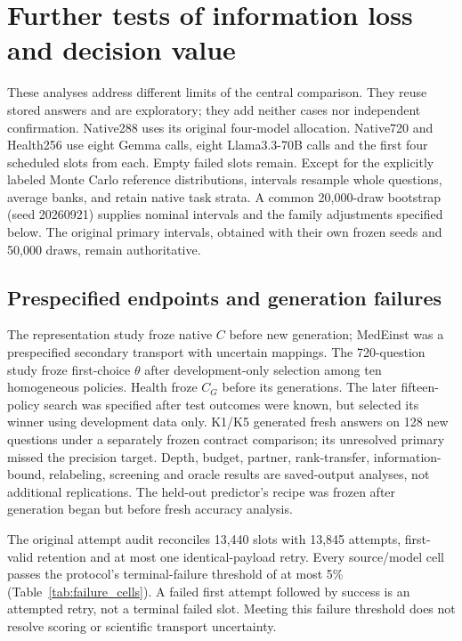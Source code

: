 \section{Further tests of information loss and decision value}\label{app:review_followthrough}
These analyses address different limits of the central comparison. They reuse stored answers and are exploratory; they add neither cases nor independent confirmation. Native288 uses its original four-model allocation. Native720 and Health256 use eight Gemma calls, eight Llama3.3-70B calls and the first four scheduled slots from each. Empty failed slots remain. Except for the explicitly labeled Monte Carlo reference distributions, intervals resample whole questions, average banks, and retain native task strata. A common 20,000-draw bootstrap (seed 20260921) supplies nominal intervals and the family adjustments specified below. The original primary intervals, obtained with their own frozen seeds and 50,000 draws, remain authoritative.

\subsection{Prespecified endpoints and generation failures}
The representation study froze native $C$ before new generation; MedEinst was a prespecified secondary transport with uncertain mappings. The 720-question study froze first-choice $\theta$ after development-only selection among ten homogeneous policies. Health froze $C_G$ before its generations. The later fifteen-policy search was specified after test outcomes were known, but selected its winner using development data only. K1/K5 generated fresh answers on 128 new questions under a separately frozen contract comparison; its unresolved primary missed the precision target. Depth, budget, partner, rank-transfer, information-bound, relabeling, screening and oracle results are saved-output analyses, not additional replications. The held-out predictor's recipe was frozen after generation began but before fresh accuracy analysis.

The original attempt audit reconciles 13,440 slots with 13,845 attempts, first-valid retention and at most one identical-payload retry. Every source/model cell passes the protocol's terminal-failure threshold of at most 5\% (Table~\ref{tab:failure_cells}). A failed first attempt followed by success is an attempted retry, not a terminal failed slot. Meeting this failure threshold does not resolve scoring or scientific transport uncertainty.

